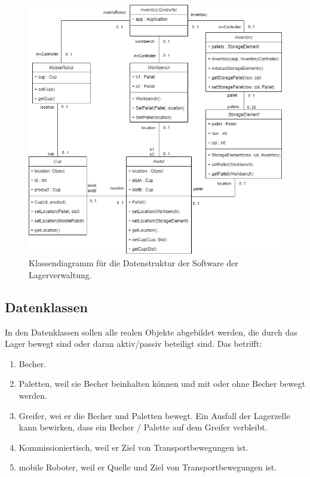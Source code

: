 \begin{figure}
        \caption[Klassendiagramm Datenmodell ]
        {\small Klassendiagramm für die Datenstruktur der Software der Lagerverwaltung.
        }\label{fig:figure15}
        \includegraphics[width = \textwidth ]{Bilder/Klassendiagramm_Datenstruktur}
        \centering
\end{figure}

\subsection{Datenklassen}

In den Datenklassen sollen alle realen Objekte abgebildet werden, die durch das Lager bewegt sind oder daran aktiv/passiv beteiligt sind. 
Das betrifft: 

\begin{enumerate}
        \item Becher.
        \item Paletten, weil sie Becher beinhalten können und mit oder ohne Becher bewegt werden. 
        \item Greifer, wei er die Becher und Paletten bewegt. Ein Ausfall der Lagerzelle kann bewirken, dass ein Becher / Palette auf dem Greifer verbleibt.
        \item Kommissioniertisch, weil er Ziel von Transportbewegungen ist.
        \item mobile Roboter, weil er Quelle und Ziel von Transportbewegungen ist.
\end{enumerate}

